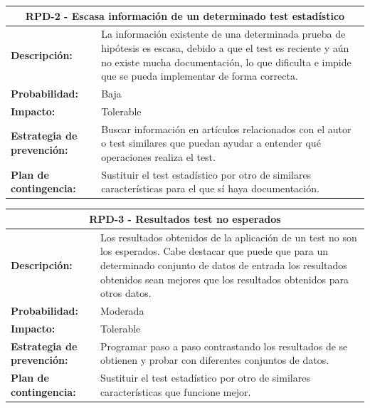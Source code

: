\begin{table}[H]
	\begin{tabular}{| p{4cm}| p{10cm} |}
		\hline
		\multicolumn{2}{|c|}{\textbf{RPD-2} - Escasa información de un determinado test estadístico} \\ \hline
		\textbf{Descripción:} & La información existente de una determinada prueba de hipótesis es escasa, debido a que el test es reciente y aún no existe mucha documentación, lo que dificulta e impide que se pueda implementar de forma correcta. \\ \hline
		\textbf{Probabilidad:} & Baja \\ \hline
		\textbf{Impacto:} & Tolerable \\ \hline
		\textbf{Estrategia de prevención:} & Buscar información en artículos relacionados con el autor o test similares que puedan ayudar a entender qué operaciones realiza el test. \\ \hline
		\textbf{Plan de contingencia:} & Sustituir el test estadístico por otro de similares características para el que sí haya documentación. \\ \hline
	\end{tabular}
\end{table}

\begin{table}[H]
	\begin{tabular}{| p{4cm}| p{10cm} |}
		\hline
		\multicolumn{2}{|c|}{\textbf{RPD-3} - Resultados test no esperados} \\ \hline
		\textbf{Descripción:} & Los resultados obtenidos de la aplicación de un test no son los esperados. Cabe destacar que puede que para un determinado conjunto de datos de entrada los resultados obtenidos sean mejores que los resultados obtenidos para otros datos. \\ \hline
		\textbf{Probabilidad:} & Moderada \\ \hline
		\textbf{Impacto:} & Tolerable \\ \hline
		\textbf{Estrategia de prevención:} & Programar paso a paso contrastando los resultados de se obtienen y probar con diferentes conjuntos de datos. \\ \hline
		\textbf{Plan de contingencia:} & Sustituir el test estadístico por otro de similares características que funcione mejor. \\ \hline
	\end{tabular}
\end{table}

